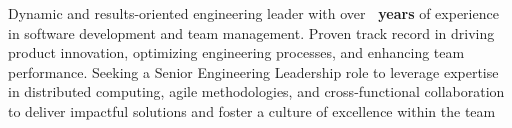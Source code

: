 Dynamic and results-oriented engineering leader with over \textbf{\yearsExp \ years} of experience in software development and team management. Proven track record in driving product innovation, optimizing engineering processes, and enhancing team performance. 
Seeking a Senior Engineering Leadership role to leverage expertise in distributed computing, agile methodologies, and cross-functional collaboration to deliver impactful solutions and foster a culture of excellence within the team
